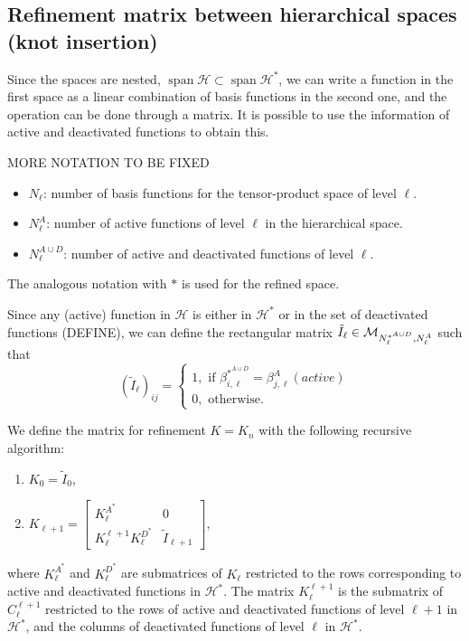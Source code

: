 \documentclass[a4paper]{siamltex1213}
\newcommand{\Rd}{\color{red}}
\DeclareMathOperator{\Span}{span}
\newcommand\HH{\mathcal H}
\begin{document}
\subsection{Refinement matrix between hierarchical spaces (knot insertion)}
Since the spaces are nested, $\Span\HH \subset \Span\HH^*$, we can write a function in the first space as a linear combination of basis functions in the second one, and the operation can be done through a matrix. It is possible to use the information of active and deactivated functions to obtain this. 

{\Rd MORE NOTATION TO BE FIXED
\begin{itemize}
\item $N_\ell$: number of basis functions for the tensor-product space of level $\ell$.
\item $N^A_\ell$: number of active functions of level $\ell$ in the hierarchical space.
\item $N^{A\cup D}_\ell$: number of active and deactivated functions of level $\ell$.
\end{itemize}
The analogous notation with $*$ is used for the refined space.
}

Since any (active) function in $\HH$ is either in $\HH^*$ or in the set of deactivated functions {\Rd (DEFINE)}, we can define the rectangular matrix $\tilde I_\ell \in {\cal M}_{N^{*^{A\cup D}}_{\ell}, N^A_\ell}$ such that 
\begin{equation*}
(\tilde I_\ell)_{ij} = \left \{ 
\begin{array}{l}
1, \text{ if }  \beta^{*^{A \cup D}}_{i,\ell} = \beta^A_{j,\ell} (active)\\
0, \text{ otherwise. }
\end{array}
\right.
\end{equation*}

We define the matrix for refinement $K = K_n$ with the following recursive algorithm:
\begin{enumerate}
\item $K_0 = \tilde I_0$,
\item $K_{\ell+1} = \left [ 
\begin{array}{cc}
K^{A^*}_\ell & 0 \\
K_\ell^{\ell+1} K^{D^*}_\ell & \tilde I_{\ell+1}
\end{array}
\right]$,
\end{enumerate}
where $K_\ell^{A^*}$ and $K_\ell^{D^*}$ are submatrices of $K_\ell$ restricted to the rows corresponding to {\Rd active and deactivated functions in $\HH^*$. The matrix $K_\ell^{\ell+1}$ is the submatrix of $C_\ell^{\ell+1}$ restricted to the rows of active and deactivated functions of level $\ell+1$ in $\HH^*$, and the columns of deactivated functions of level $\ell$ in $\HH^*$. }
\end{document}
